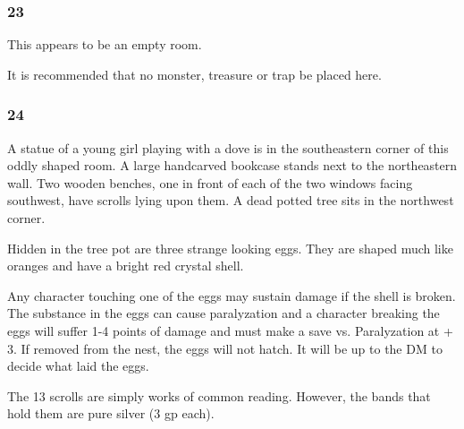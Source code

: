 \documentclass[palace_of_the_silver_princess]{subfiles}
\begin{document}
\subsubsection{23}
\begin{quotebox}
    This appears to be an empty room.
\end{quotebox}

It is recommended that no monster, treasure or trap be placed here.

\subsubsection{24}
\begin{quotebox}
    A statue of a young girl playing with a dove is in the southeastern
    corner of this oddly shaped room. A large handcarved bookcase stands
    next to the northeastern wall. Two wooden benches, one in front of
    each of the two windows facing southwest, have scrolls lying upon
    them. A dead potted tree sits in the northwest corner.
\end{quotebox}

Hidden in the tree pot are three strange looking eggs. They are shaped
much like oranges and have a bright red crystal shell.

Any character touching one of the eggs may sustain damage if the shell
is broken. The substance in the eggs can cause paralyzation and a
character breaking the eggs will suffer 1-4 points of damage and must
make a save vs. Paralyzation at + 3. If removed from the nest, the eggs
will not hatch. It will be up to the DM to decide what laid the eggs.

The 13 scrolls are simply works of common reading. However, the bands
that hold them are pure silver (3 gp each).
\end{document}

